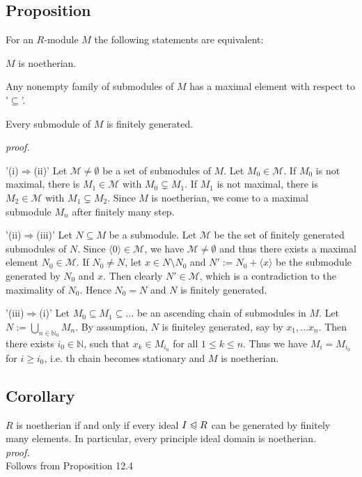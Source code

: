 \documentclass[12pt]{book}
\begin{document}
\begin{spacing}{1.3}
\subsection{Proposition} %
For an $R$-module $M$ the following statements are equivalent:
\begin{compactenum}
\item $M$ is noetherian.
\item Any nonempty family of submodules of $M$ has a maximal element with respect to '$\subseteq$'.
\item Every submodule of $M$ is finitely generated.
\end{compactenum}
\textit{proof.}
\begin{compactenum}
\item['(i)$\Rightarrow$(ii)'] Let $\mathcal{M} \neq \emptyset$ be a set of submodules of $M$. Let $M_0 \in \mathcal{M}$. If $M_0$ is not maximal, there is $M_1 \in \mathcal{M}$ with $M_0 \subsetneq M_1$. If $M_1$ is not maximal, there is $M_2 \in \mathcal{M}$ with $M_1 \subsetneq M_2$. Since $M$ is noetherian, we come to a maximal submodule $M_n$ after finitely many step.
\item['(ii)$\Rightarrow$(iii)'] Let $N \subseteq M$ be a submodule. Let $\mathcal{M}$ be the set of finitely generated submodules of $N$. Since $\langle 0 \rangle \in \mathcal{M}$, we have $\mathcal{M} \neq \emptyset$ and thus there exists a maximal element $N_0 \in \mathcal{M}$. If $N_0 \neq N$, let $x \in N \setminus N_0$ and $N':=N_0 + \langle x \rangle $ be the submodule generated by $N_0$ and $x$. Then clearly $N' \in \mathcal{M}$, which is a contradiction to the maximality of $N_0$. Hence $N_0=N$ and $N$ is finitely generated. 
\item['(iii)$\Rightarrow$(i)'] Let $M_0 \subseteq M_1 \subseteq \ldots$ be an ascending chain of submodules in $M$. Let $N:= \bigcup_{n \in \mathbb{N}_0} M_n$. By assumption, $N$ is finiteley generated, say by $x_1, \ldots x_n$. Then there exists $i_0 \in \mathbb{N}$, such that $x_k \in M_{i_0}$ for all $1 \leqslant k \leqslant n$. Thus we have $M_i=M_{i_0}$ for $i \geqslant i_0$, i.e. th chain becomes stationary and $M$ is noetherian.
\end{compactenum}

\subsection{Corollary} %
$R$ is noetherian if and only if every ideal $I \trianglelefteqslant R$ can be generated by finitely many elements. In particular, every principle ideal domain is noetherian.\\
\textit{proof.}\\
Follows from Proposition 12.4


\end{spacing}
\end{document}
